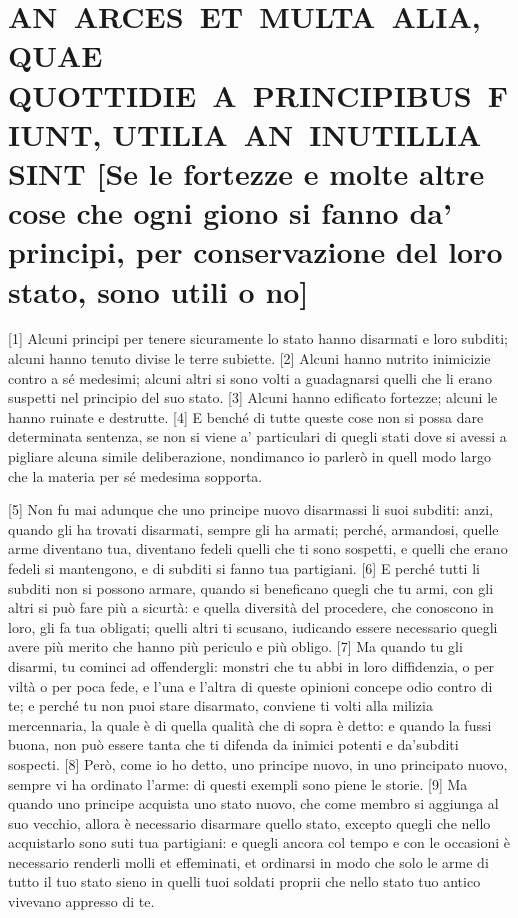 \quebra\section{AN~ARCES~ET~MULTA~ALIA,~QUAE QUOTTIDIE~A~PRINCIPIBUS~FIUNT, UTILIA~AN~INUTILLIA SINT\break
{[}Se le fortezze e molte altre cose che ogni giono si fanno da'
principi, per conservazione del loro stato, sono utili o no{]}}

{[}1{]} Alcuni principi per tenere sicuramente lo stato hanno disarmati
e loro subditi; alcuni hanno tenuto divise le terre subiette. {[}2{]}
Alcuni hanno nutrito inimicizie contro a sé medesimi; alcuni altri si
sono volti a guadagnarsi quelli che li erano suspetti nel principio del
suo stato. {[}3{]} Alcuni hanno edificato fortezze; alcuni le hanno
ruinate e destrutte. {[}4{]} E benché di tutte queste cose non si possa
dare determinata sentenza, se non si viene a' particulari di quegli
stati dove si avessi a pigliare alcuna simile deliberazione, nondimanco
io parlerò in quell modo largo che la materia per sé medesima sopporta.

{[}5{]} Non fu mai adunque che uno principe nuovo disarmassi li suoi
subditi: anzi, quando gli ha trovati disarmati, sempre gli ha armati;
perché, armandosi, quelle arme diventano tua, diventano fedeli quelli
che ti sono sospetti, e quelli che erano fedeli si mantengono, e di
subditi si fanno tua partigiani. {[}6{]} E perché tutti li subditi non
si possono armare, quando si beneficano quegli che tu armi, con gli
altri si può fare più a sicurtà: e quella diversità del procedere, che
conoscono in loro, gli fa tua obligati; quelli altri ti scusano,
iudicando essere necessario quegli avere più merito che hanno più
periculo e più obligo. {[}7{]} Ma quando tu gli disarmi, tu cominci ad
offendergli: monstri che tu abbi in loro diffidenzia, o per viltà o per
poca fede, e l'una e l'altra di queste opinioni concepe odio contro di
te; e perché tu non puoi stare disarmato, conviene ti volti alla milizia
mercennaria, la quale è di quella qualità che di sopra è detto: e quando
la fussi buona, non può essere tanta che ti difenda da inimici potenti e
da'subditi sospecti. {[}8{]} Però, come io ho detto, uno principe nuovo,
in uno principato nuovo, sempre vi ha ordinato l'arme: di questi exempli
sono piene le storie. {[}9{]} Ma quando uno principe acquista uno stato
nuovo, che come membro si aggiunga al suo vecchio, allora è necessario
disarmare quello stato, excepto quegli che nello acquistarlo sono suti
tua partigiani: e quegli ancora col tempo e con le occasioni è
necessario renderli molli et effeminati, et ordinarsi in modo che solo
le arme di tutto il tuo stato sieno in quelli tuoi soldati proprii che
nello stato tuo antico vivevano appresso di te.

